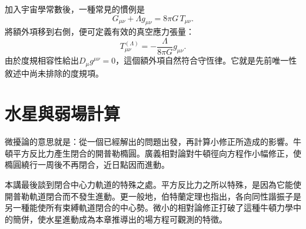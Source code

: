 \begin{classroomqa}
\end{classroomqa}

加入宇宙學常數後，一種常見的慣例是
\begin{equation}
 G_{\mu\nu}+\Lambda g_{\mu\nu}
 =
 8\pi G\,T_{\mu\nu}.
\end{equation}
將額外項移到右側，便可定義有效的真空應力張量：
\begin{equation}
 T_{\mu\nu}^{(\Lambda)}
 =
 -\frac{\Lambda}{8\pi G}g_{\mu\nu}.
\end{equation}
由於度規相容性給出\(D_\mu g^{\mu\nu}=0\)，這個額外項自然符合守恆律。它就是先前唯一性敘述中尚未排除的度規項。

\section{水星與弱場計算}

\begin{classroomqa}
\end{classroomqa}

微擾論的意思就是：從一個已經解出的問題出發，再計算小修正所造成的影響。牛頓平方反比力產生閉合的開普勒橢圓。廣義相對論對牛頓徑向方程作小幅修正，使橢圓繞行一周後不再閉合，近日點因而進動。

本講最後談到閉合中心力軌道的特殊之處。平方反比力之所以特殊，是因為它能使開普勒軌道閉合而不發生進動。更一般地，伯特蘭定理也指出，各向同性諧振子是另一種能使所有束縛軌道閉合的中心勢。微小的相對論修正打破了這種牛頓力學中的簡併，使水星進動成為本章推導出的場方程可觀測的特徵。